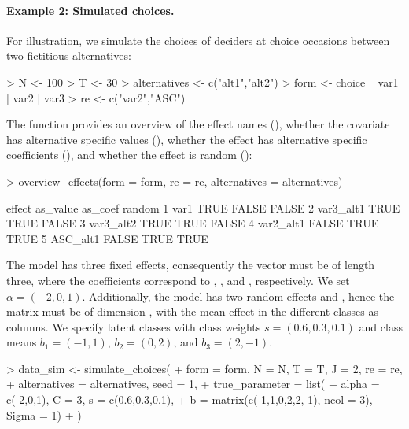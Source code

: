 \documentclass[article,shortnames]{jss}
\newcommand{\fct}[1]{\code{#1()}}
\begin{document}
\paragraph{Example 2: Simulated choices.}

For illustration, we simulate the choices of  deciders at  choice occasions between two fictitious alternatives:

\begin{Schunk}
\begin{Sinput}
> N <- 100
> T <- 30
> alternatives <- c("alt1","alt2")
> form <- choice ~ var1 | var2 | var3
> re <- c("var2","ASC")
\end{Sinput}
\end{Schunk}

The \fct{overview\_effects} function provides an overview of the effect names (), whether the covariate has alternative specific values (), whether the effect has alternative specific coefficients (), and whether the effect is random ():

\begin{Schunk}
\begin{Sinput}
> overview_effects(form = form, re = re, alternatives = alternatives)
\end{Sinput}
\begin{Soutput}
     effect as_value as_coef random
1      var1     TRUE   FALSE  FALSE
2 var3_alt1     TRUE    TRUE  FALSE
3 var3_alt2     TRUE    TRUE  FALSE
4 var2_alt1    FALSE    TRUE   TRUE
5  ASC_alt1    FALSE    TRUE   TRUE
\end{Soutput}
\end{Schunk}

The model has three fixed effects, consequently the vector  must be of length three, where the coefficients correspond to , , and , respectively. We set $\alpha = (-2,0,1)$. Additionally, the model has two random effects  and , hence the matrix  must be of dimension , with the mean effect in the different classes as columns. We specify  latent classes with class weights $s = (0.6,0.3,0.1)$ and class means $b_1 = (-1,1)$, $b_2 = (0,2)$, and $b_3 = (2,-1)$.

\begin{Schunk}
\begin{Sinput}
> data_sim <- simulate_choices(
+    form = form, N = N, T = T, J = 2, re = re,
+    alternatives = alternatives, seed = 1,
+    true_parameter = list(
+      alpha = c(-2,0,1), C = 3, s = c(0.6,0.3,0.1),
+      b = matrix(c(-1,1,0,2,2,-1), ncol = 3), Sigma = 1)
+  )
\end{Sinput}
\end{Schunk}
\end{document}

